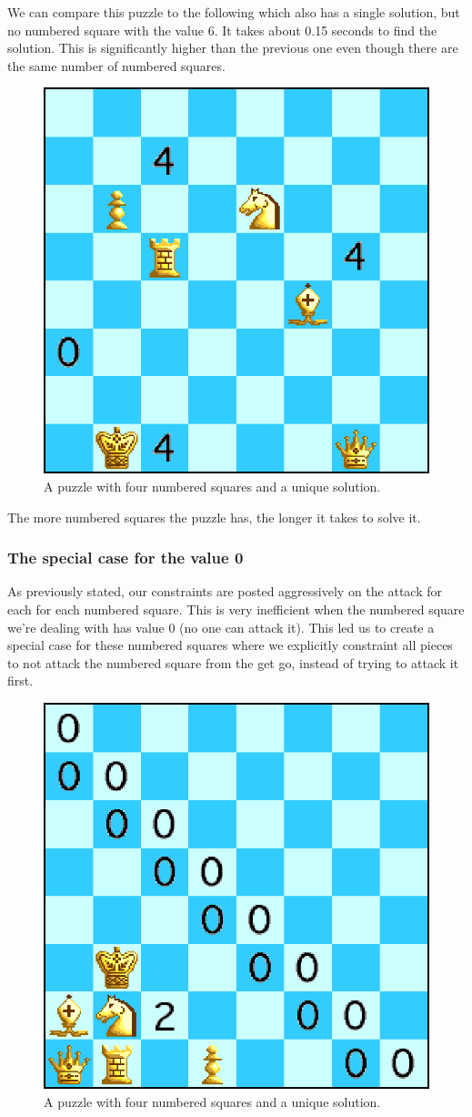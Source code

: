 \documentclass[runningheads]{llncs}
\begin{document}
We can compare this puzzle to the following which also has a single solution,
but no numbered square with the value 6. It takes about 0.15 seconds to
find the solution. This is significantly higher than the previous one
even though there are the same number of numbered squares.

\begin{figure}[H]
  \centering
  \includegraphics[width=0.5\linewidth]{figures/chess2.eps}
  \caption{A puzzle with four numbered squares and a unique solution.}\label{fig:fig4}
\end{figure}

The more numbered squares the puzzle has, the longer it takes to solve it.

\subsubsection{The special case for the value 0}
As previously stated, our constraints are posted aggressively on the attack
for each for each numbered square. This is very inefficient when the numbered
square we're dealing with has value 0 (no one can attack it). This led us to
create a special case for these numbered squares where we explicitly constraint
all pieces to not attack the numbered square from the get go, instead of
trying to attack it first.

\begin{figure}[H]
  \centering
  \includegraphics[width=0.5\linewidth]{figures/chess8.eps}
  \caption{A puzzle with four numbered squares and a unique solution.}\label{fig:fig5}
\end{figure}
\end{document}
